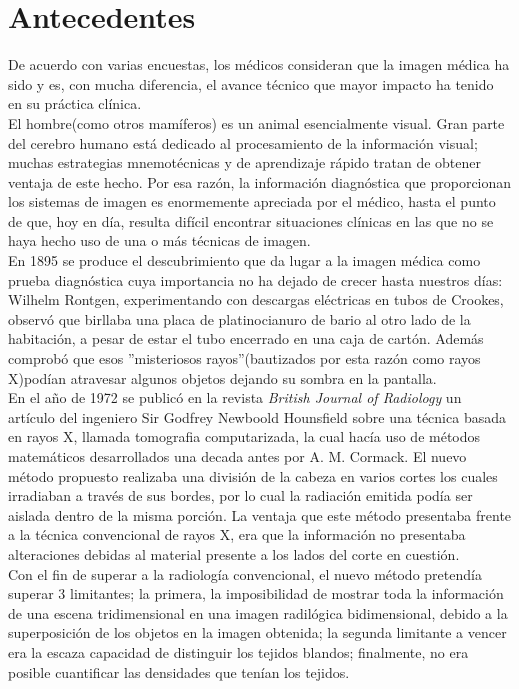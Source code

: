 \documentclass[12pt]{report}
\begin{document}
\section{Antecedentes}
De acuerdo con varias encuestas, los médicos consideran que la imagen médica ha sido y es, con mucha diferencia, el avance técnico que mayor impacto ha tenido en su práctica clínica.\\

El hombre(como otros mamíferos) es un animal esencialmente visual. Gran parte del cerebro humano está dedicado al procesamiento de la información visual; muchas estrategias mnemotécnicas y de aprendizaje rápido tratan de obtener ventaja de este hecho. Por esa razón, la información diagnóstica que proporcionan los sistemas de imagen es enormemente apreciada por el médico, hasta el punto de que, hoy en día, resulta difícil encontrar situaciones clínicas en las que no se haya hecho uso de una o más técnicas de imagen.\\ 

En 1895 se produce el descubrimiento que da lugar a la imagen médica como prueba diagnóstica cuya importancia no ha dejado de crecer hasta nuestros días: Wilhelm Rontgen, experimentando con descargas eléctricas en tubos de Crookes, observó que birllaba una placa de platinocianuro de bario al otro lado de la habitación, a pesar de estar el tubo encerrado en una caja de cartón. Además comprobó que esos ''misteriosos rayos''(bautizados por esta razón como rayos X)podían atravesar algunos objetos dejando su sombra en la pantalla.\cite{biom}\\ 

En el año de 1972 se publicó en la revista \textit{British Journal of Radiology} un artículo del ingeniero Sir Godfrey Newboold Hounsfield sobre una
técnica basada en rayos X, llamada tomografia computarizada, la cual hacía uso de métodos matemáticos desarrollados una decada antes por A. M. Cormack.
El nuevo método propuesto realizaba una división de la cabeza en varios cortes los cuales irradiaban a través de sus bordes, por lo cual la radiación emitida podía ser aislada dentro de la misma porción. La ventaja que este método presentaba frente a la técnica convencional de rayos X, era que la información no presentaba alteraciones debidas al material presente a los lados del corte en cuestión.\\ 

Con el fin de superar a la radiología convencional, el nuevo método pretendía superar 3 limitantes; la primera, la imposibilidad de mostrar toda la información de una escena tridimensional en una imagen radilógica bidimensional, debido a la superposición de los objetos en la imagen obtenida; la segunda limitante a vencer era la escaza capacidad de distinguir los tejidos blandos; finalmente, no era posible cuantificar las densidades que tenían los tejidos.\cite{TCFundamentos}  \\ 
\end{document}
